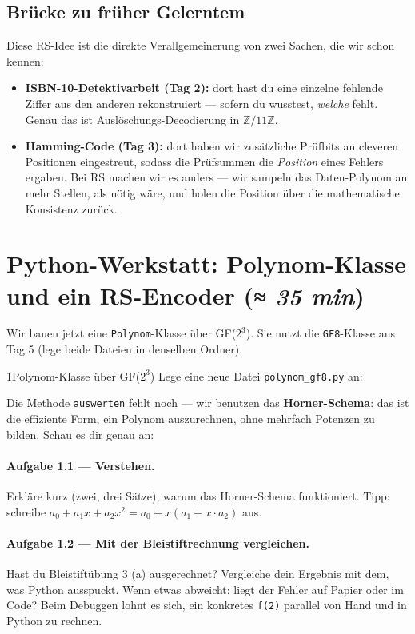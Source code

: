 \subsection*{Brücke zu früher Gelerntem}

Diese RS-Idee ist die direkte Verallgemeinerung von zwei Sachen, die
wir schon kennen:

\begin{itemize}
\item \textbf{ISBN-10-Detektivarbeit (Tag 2):} dort hast du eine
  einzelne fehlende Ziffer aus den anderen rekonstruiert — sofern du
  wusstest, \emph{welche} fehlt. Genau das ist Auslöschungs-Decodierung
  in $\mathbb{Z}/11\mathbb{Z}$.
\item \textbf{Hamming-Code (Tag 3):} dort haben wir zusätzliche
  Prüfbits an cleveren Positionen eingestreut, sodass die Prüfsummen
  die \emph{Position} eines Fehlers ergaben. Bei RS machen wir es
  anders — wir sampeln das Daten-Polynom an mehr Stellen, als nötig
  wäre, und holen die Position über die mathematische Konsistenz
  zurück.
\end{itemize}

\section{Python-Werkstatt: Polynom-Klasse und ein RS-Encoder \normalfont(\textit{≈ 35 min})}

Wir bauen jetzt eine \texttt{Polynom}-Klasse über GF($2^3$). Sie
nutzt die \texttt{GF8}-Klasse aus Tag 5 (lege beide Dateien in
denselben Ordner).

\begin{pythoneinheit}{1}{Polynom-Klasse über GF($2^3$)}
Lege eine neue Datei \texttt{polynom\_gf8.py} an:


Die Methode \texttt{auswerten} fehlt noch — wir benutzen das
\textbf{Horner-Schema}: das ist die effiziente Form, ein Polynom
auszurechnen, ohne mehrfach Potenzen zu bilden. Schau es dir genau
an:


\paragraph{Aufgabe 1.1 — Verstehen.}
Erkläre kurz (zwei, drei Sätze), warum das Horner-Schema
funktioniert. Tipp: schreibe $a_0 + a_1 x + a_2 x^2 = a_0 + x(a_1 +
x \cdot a_2)$ aus.

\paragraph{Aufgabe 1.2 — Mit der Bleistiftrechnung vergleichen.}
Hast du Bleistiftübung 3 (a) ausgerechnet? Vergleiche dein Ergebnis
mit dem, was Python ausspuckt. Wenn etwas abweicht: liegt der Fehler
auf Papier oder im Code? Beim Debuggen lohnt es sich, ein konkretes
\texttt{f(2)} parallel von Hand und in Python zu rechnen.
\end{pythoneinheit}

